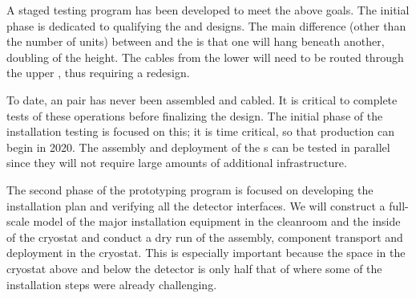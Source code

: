 
A staged testing program has been developed to meet the above goals.  The initial phase is dedicated to qualifying the  and  designs. The main difference (other than the number of units) between  and the   is that one  will hang beneath another, doubling of the height. The cables from the lower  will need to be routed through the upper , thus requiring a redesign. 

To date, an  pair has never been assembled and cabled. It is critical to complete tests of these operations before finalizing the  design. The initial phase of the installation testing is focused on this; it is time critical, so that  production can begin in 2020. The assembly and deployment of the s can  be tested in parallel since they will not require large amounts of additional infrastructure.

The second phase of the prototyping program is focused on developing the installation plan and verifying all the detector interfaces. 
We will construct a full-scale model of the major installation equipment in the cleanroom and the inside of the cryostat and conduct a dry run of the assembly, component transport and deployment in the cryostat. 
This is especially important because the space in the  cryostat above and below the detector is only half that of  where some of the installation steps were already challenging.


